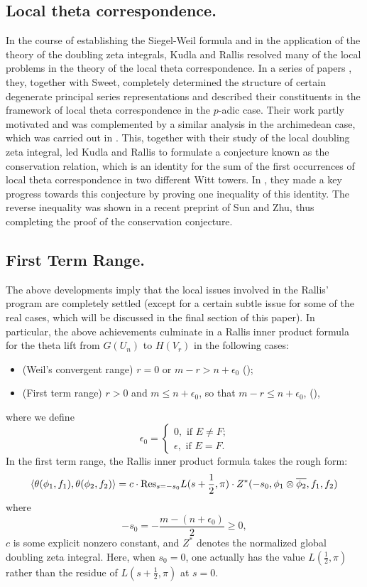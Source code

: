 \documentclass[10pt]{amsart}
\theoremstyle{plain}
\numberwithin{equation}{section}
\begin{document}
\subsection{\bf  Local theta correspondence.} In the course of
establishing the Siegel-Weil formula and in the application of the
theory of the doubling zeta integrals, 
Kudla and Rallis resolved many of the local problems  in the theory of the
local theta correspondence. In a series of papers \cite{KR3,KR4,KR6,
  KS, S1, S2}, they, together with Sweet, completely determined the
structure of certain degenerate principal series representations and
described their constituents in the framework of local theta
correspondence in the $p$-adic case. Their work partly motivated and was
complemented by a similar analysis in the archimedean case, which was
carried out in \cite{L1, L2, HL, LZ1, LZ2, LZ3}.
This, together with their study of the local doubling zeta integral,
led Kudla and Rallis to formulate a conjecture known as the conservation
relation, which is an identity for the sum of  the first occurrences
of local theta correspondence in two different Witt towers. In
\cite{KR6}, they made a key progress towards this conjecture by proving one
inequality of this identity. The reverse inequality was shown in a
recent preprint \cite{SZ} of Sun and Zhu, thus completing the proof of the
conservation conjecture.
\vskip 10pt

\subsection{\bf First Term Range.}
The above developments imply that the local issues involved in the
Rallis' program are completely settled (except for a certain subtle issue
for some of the real cases, which will be discussed in the final section of this paper). In particular,
the above achievements culminate in a Rallis inner product formula for
the theta lift from $G(U_n)$ to $H(V_r)$ in the following cases:
\begin{itemize}
\item (Weil's convergent range) $r=0$ or $m-r > n+\epsilon_0$ (\cite{KR1, Li, I3, Y4});
\item  (First term range)  $r > 0$ and  $m
  \leq n+ \epsilon_0$, so that  $m - r \leq n+ \epsilon_0$, (\cite{KR5, GT, Y4}), 
\end{itemize}
where we define
\[  
\epsilon_0  = \begin{cases}
0, \text{ if $E \ne F$;} \\
\epsilon, \text{  if $E = F$.}\end{cases} 
\] 
In the first term range, the Rallis inner product formula takes the rough  form:
\[  
\langle \theta(\phi_1,f_1), \theta(\phi_2,f_2) \rangle = c \cdot 
{\rm Res}_{s =-s_0} L(s + \frac{1}{2}, \pi)   \cdot Z^*(-s_0, \phi_1
\otimes \overline{\phi_2}, f_1, f_2) 
\]
where 
\[  
-s_0  = -\frac{m - (n+\epsilon_0)}{2} \geq 0, 
\]
$c$ is some explicit nonzero constant, and $Z^*$ denotes the
normalized global doubling zeta integral.  Here, when $s _0 = 0$, one
actually has the value $L(\frac{1}{2}, \pi)$ rather than the residue
of $L(s+\frac{1}{2},\pi)$ at $s = 0$. 
\vskip 5pt
\end{document}
